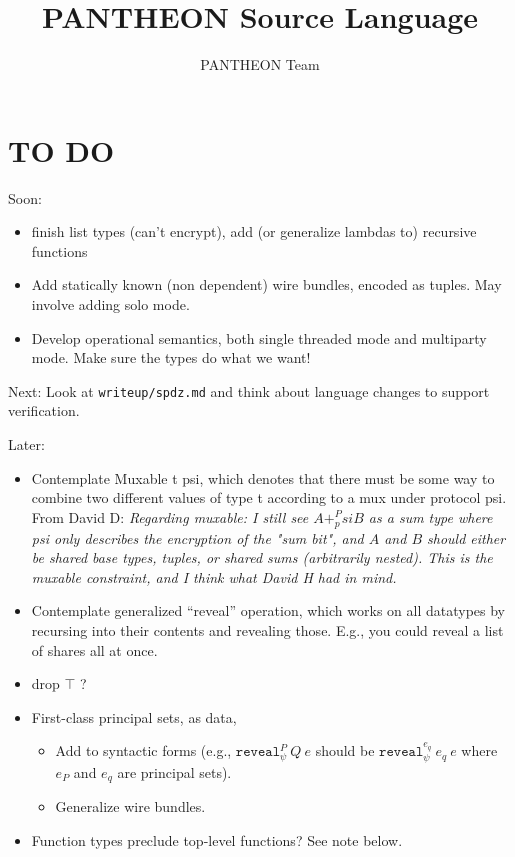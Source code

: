 \documentclass[10pt]{article}
\title{PANTHEON Source Language}
\author{PANTHEON Team}
\newcommand{\kw}[1]{\ensuremath{\mathtt{#1}}}
\newcommand{\ereveal}[4]{\ensuremath{\kw{reveal}^{#1}_{#4}~{#2}~{#3}}}
\begin{document}
\maketitle

\section{TO DO}

Soon:
\begin{itemize}
\item finish list types (can't encrypt), add (or generalize lambdas
  to) recursive functions
\item Add statically known (non dependent) wire bundles, encoded as
  tuples. May involve adding solo mode.
\item Develop operational semantics, both single threaded mode and
  multiparty mode. Make sure the types do what we want!
\end{itemize}

Next: Look at \texttt{writeup/spdz.md} and think about language
changes to support verification.

Later:
\begin{itemize}
\item Contemplate Muxable t psi, which denotes that there must be some
  way to combine two different values of type t according to a mux
  under protocol psi. From David D: \emph{Regarding muxable: I still see $A +^P_psi B$ as a sum type where psi only describes the encryption of the "sum bit", and $A$ and $B$ should either be shared base types, tuples, or shared sums (arbitrarily nested). This is the muxable constraint, and I think what David H had in mind.}
\item Contemplate generalized ``reveal'' operation, which works on all
  datatypes by recursing into their contents and revealing
  those. E.g., you could reveal a list of shares all at once.
\item drop $\top$ ?
\item First-class principal sets, as data,
  \begin{itemize}
    \item Add to syntactic forms (e.g., $\ereveal{P}{Q}{e}{\psi}$ should be
    $\ereveal{e_q}{e_q}{e}{\psi}$ where $e_P$ and $e_q$ are principal
    sets).
  \item Generalize wire bundles.
  \end{itemize}
\item Function types preclude top-level functions? See note below.
\end{itemize}
\end{document}

